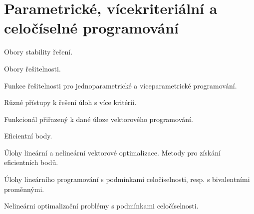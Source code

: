 \newpage
\section{Parametrické, vícekriteriální a celočíselné programování}
\begin{pozadavky}
\begin{pitemize}
\item Obory stability řešení.
\item Obory řešitelnosti.
\item Funkce řešitelnosti pro jednoparametrické a víceparametrické programování.
\item Různé přístupy k řešení úloh s více kritérii.

\item Funkcionál přiřazený k dané úloze vektorového programování.
\item Eficientní body.
\item Úlohy lineární a nelineární vektorové optimalizace.
\itme Metody pro získání eficientních bodů.
\item Úlohy lineárního programování s podmínkami celočíselnosti, resp. s bivalentními proměnnými.
\item Nelineárni optimalizační problémy s podmínkami celočíselnosti.
\end{pitemize}
\end{pozadavky}